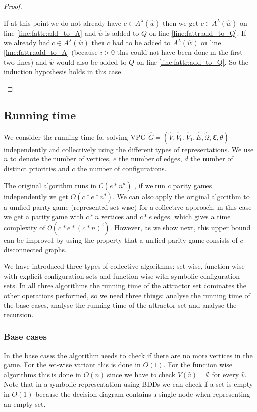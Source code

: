 \begin{theorem}
\begin{proof}
\begin{itemize}
			If at this point we do not already have $c \in A^\lambda(\hat{w})$ then we get $c \in A^\lambda(\hat{w})$ on line \ref{line:fattr:add_to_A} and $\hat{w}$ is added to $Q$ on line \ref{line:fattr:add_to_Q}. If we already had $c \in A^\lambda(\hat{w})$ then $c$ had to be added to $A^\lambda(\hat{w})$ on line \ref{line:fattr:add_to_A} (because $i > 0$ this could not have been done in the first two lines) and $\hat{w}$ would also be added to $Q$ on line \ref{line:fattr:add_to_Q}. So the induction hypothesis holds in this case.
		\end{itemize}
		
	\end{proof}
\end{theorem}

\subsection{Running time}
We consider the running time for solving VPG $\hat{G} = (\hat{V},\hat{V}_0,\hat{V}_1,\hat{E},\hat{\Omega},\mathfrak{C},\theta)$ independently and collectively using the different types of representations. We use $n$ to denote the number of vertices, $e$ the number of edges, $d$ the number of distinct priorities and $c$ the number of configurations.

The original algorithm runs in $O(e * n^d)$ \cite{friedmanPG}, if we run $c$ parity games independently we get $O(c * e * n ^d)$. We can also apply the original algorithm to a unified parity game (represented set-wise) for a collective approach, in this case we get a parity game with $c*n$ vertices and $c*e$ edges. which gives a time complexity of $O(c*e*(c*n)^d)$. However, as we show next, this upper bound can be improved by using the property that a unified parity game consists of $c$ disconnected graphs.

We have introduced three types of collective algorithms: set-wise, function-wise with explicit configuration sets and function-wise with symbolic configuration sets. In all three algorithms the running time of the attractor set dominates the other operations performed, so we need three things: analyse the running time of the base cases, analyse the running time of the attractor set and analyse the recursion.

\subsubsection{Base cases} In the base cases the algorithm needs to check if there are no more vertices in the game. For the set-wise variant this is done in $O(1)$. For the function wise algorithms this is done in $O(n)$ since we have to check $V(\hat{v}) = \emptyset$ for every $\hat{v}$. Note that in a symbolic representation using BDDs we can check if a set is empty in $O(1)$ because the decision diagram contains a single node when representing an empty set.

